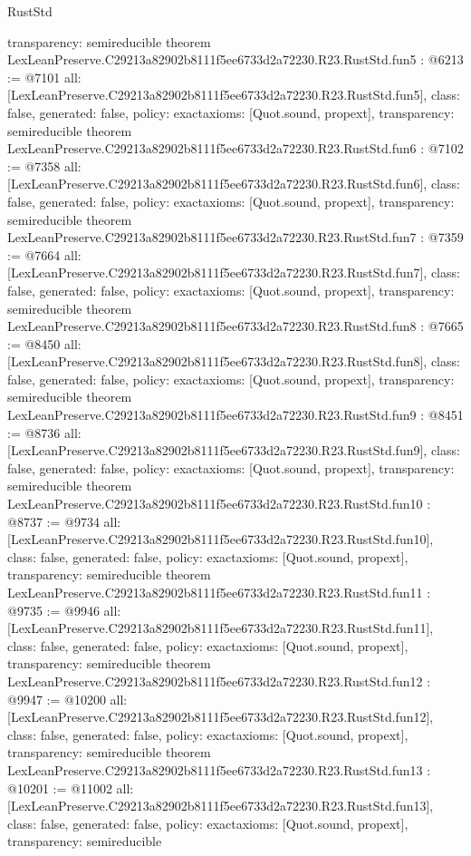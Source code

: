 \begin{lexlean}{RustStd}
\begin{coremodule}
{  transparency: semireducible
}
theorem LexLeanPreserve.C29213a82902b8111f5ee6733d2a72230.R23.RustStd.fun5 : @6213 := @7101 {
  all: [LexLeanPreserve.C29213a82902b8111f5ee6733d2a72230.R23.RustStd.fun5],
  class: false,
  generated: false,
  policy: exact{axioms: [Quot.sound, propext]},
  transparency: semireducible
}
theorem LexLeanPreserve.C29213a82902b8111f5ee6733d2a72230.R23.RustStd.fun6 : @7102 := @7358 {
  all: [LexLeanPreserve.C29213a82902b8111f5ee6733d2a72230.R23.RustStd.fun6],
  class: false,
  generated: false,
  policy: exact{axioms: [Quot.sound, propext]},
  transparency: semireducible
}
theorem LexLeanPreserve.C29213a82902b8111f5ee6733d2a72230.R23.RustStd.fun7 : @7359 := @7664 {
  all: [LexLeanPreserve.C29213a82902b8111f5ee6733d2a72230.R23.RustStd.fun7],
  class: false,
  generated: false,
  policy: exact{axioms: [Quot.sound, propext]},
  transparency: semireducible
}
theorem LexLeanPreserve.C29213a82902b8111f5ee6733d2a72230.R23.RustStd.fun8 : @7665 := @8450 {
  all: [LexLeanPreserve.C29213a82902b8111f5ee6733d2a72230.R23.RustStd.fun8],
  class: false,
  generated: false,
  policy: exact{axioms: [Quot.sound, propext]},
  transparency: semireducible
}
theorem LexLeanPreserve.C29213a82902b8111f5ee6733d2a72230.R23.RustStd.fun9 : @8451 := @8736 {
  all: [LexLeanPreserve.C29213a82902b8111f5ee6733d2a72230.R23.RustStd.fun9],
  class: false,
  generated: false,
  policy: exact{axioms: [Quot.sound, propext]},
  transparency: semireducible
}
theorem LexLeanPreserve.C29213a82902b8111f5ee6733d2a72230.R23.RustStd.fun10 : @8737 := @9734 {
  all: [LexLeanPreserve.C29213a82902b8111f5ee6733d2a72230.R23.RustStd.fun10],
  class: false,
  generated: false,
  policy: exact{axioms: [Quot.sound, propext]},
  transparency: semireducible
}
theorem LexLeanPreserve.C29213a82902b8111f5ee6733d2a72230.R23.RustStd.fun11 : @9735 := @9946 {
  all: [LexLeanPreserve.C29213a82902b8111f5ee6733d2a72230.R23.RustStd.fun11],
  class: false,
  generated: false,
  policy: exact{axioms: [Quot.sound, propext]},
  transparency: semireducible
}
theorem LexLeanPreserve.C29213a82902b8111f5ee6733d2a72230.R23.RustStd.fun12 : @9947 := @10200 {
  all: [LexLeanPreserve.C29213a82902b8111f5ee6733d2a72230.R23.RustStd.fun12],
  class: false,
  generated: false,
  policy: exact{axioms: [Quot.sound, propext]},
  transparency: semireducible
}
theorem LexLeanPreserve.C29213a82902b8111f5ee6733d2a72230.R23.RustStd.fun13 : @10201 := @11002 {
  all: [LexLeanPreserve.C29213a82902b8111f5ee6733d2a72230.R23.RustStd.fun13],
  class: false,
  generated: false,
  policy: exact{axioms: [Quot.sound, propext]},
  transparency: semireducible
}
\end{coremodule}
\end{lexlean}
